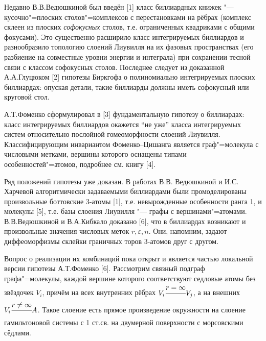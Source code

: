 
\vzmscaption

Недавно В.В.Ведюшкиной был введён [1] класс биллиардных книжек "--- кусочно"=плоских столов"=комплексов с перестановками на рёбрах (комплекс склеен из плоских \textit{софокусных} столов, т.е. ограниченных квадриками с общими фокусами). Это существенно расширило класс интегрируемых биллиардов и разнообразило топологию слоений Лиувилля на их фазовых пространствах (его разбиение на совместные уровни энергии и интеграла) при сохранении тесной связи с классом софокусных столов. Последнее следует из доказанной А.А.Глуцюком [2] гипотезы Биркгофа о полиномиально интегрируемых плоских биллиардах: опуская детали, такие биллиарды должны иметь  софокусный или круговой стол.

А.Т.Фоменко сформулировал в [3] фундаментальную гипотезу о биллиардах:  класс интегрируемых биллиардов окажется ``не уже'' класса интегрируемых систем относительно послойной гомеоморфности слоений Лиувилля. Классифицирующим инвариантом Фоменко--Цишанга является граф"=молекула с числовыми метками, вершины которого оснащены типами особенностей"=атомов, подробнее см. книгу [4].

Ряд положений гипотезы уже доказан. В работах В.В. Ведюшкиной и И.С. Харчевой алгоритмически задаваемыми биллиардами были промоделированы произвольные боттовские 3-атомы [1], т.е. невырожденные особенности ранга 1, и молекулы [5], т.е. базы слоения Лиувилля "--- графы с вершинами"=атомами. В.В.Ведюшкиной и В.А.Кибкало доказано [6], что в биллиардах возникают и произвольные значения числовых меток $r, \varepsilon, n$. Они, напомним, задают диффеоморфизмы склейки граничных торов 3-атомов друг с другом.

Вопрос о реализации их комбинаций пока открыт и является частью локальной версии гипотезы А.Т.Фоменко [6]. Рассмотрим связный подграф графа"=молекулы, каждой вершине которого соответствуют седловые атомы без звёздочек $V_i$, причём на всех внутренних рёбрах $V_i \cfrac{r = \infty}{}V_j$, а на внешних $V_i \cfrac{r \ne \infty}{}A$. Такое слоение есть прямое произведение окружности на слоение гамильтоновой системы с 1 ст.св. на двумерной поверхности с морсовскими сёдлами.


